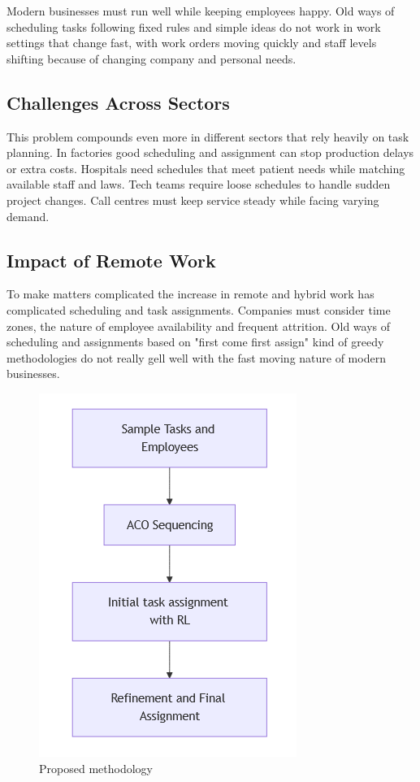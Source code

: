 \documentclass[%
aip,
cp,  %
amsmath,amssymb,
reprint,%
]{revtex4-2}
\begin{document}
	Modern businesses must run well while keeping employees happy. Old ways of scheduling
	tasks following fixed rules and simple ideas do not work in work settings that
	change fast, with work orders moving quickly and staff levels shifting because
	of changing company and personal needs.
	
	\subsection{\label{subsec:challenges}Challenges Across Sectors}
	This problem compounds even more in different sectors that rely heavily on
	task planning. In factories good scheduling and assignment can stop production
	delays or extra costs. Hospitals need schedules that meet patient needs while
	matching available staff and laws. Tech teams require loose schedules to handle
	sudden project changes. Call centres must keep service steady while facing
	varying demand.
	
	\subsection{\label{subsec:remote}Impact of Remote Work}
	To make matters complicated the increase in remote and hybrid work has
	complicated scheduling and task assignments. Companies must consider time zones,
	the nature of employee availability and frequent attrition. Old ways of scheduling
	and assignments based on "first come first assign" kind of greedy methodologies
	do not really gell well with the fast moving nature of modern businesses.
	
	\begin{figure}
		\centering
		\includegraphics[width=0.7\linewidth]{figures/Initial_flow}
		\caption{\label{fig:flow}Proposed methodology}
	\end{figure}
	
\end{document}
